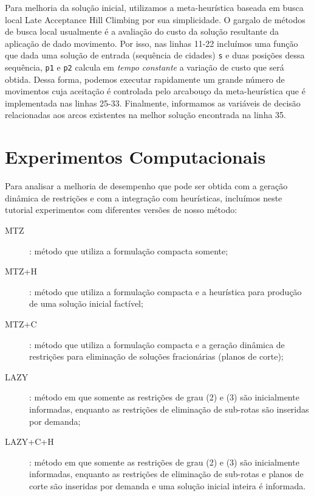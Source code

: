 \documentclass[a4paper,11pt,fleqn]{article}
\begin{document}
Para melhoria da solução inicial, utilizamos a meta-heurística baseada em busca local Late Acceptance Hill Climbing \citep{burke2017} por sua simplicidade. O gargalo de métodos de busca local usualmente é a avaliação do custo da solução resultante da aplicação de dado movimento. Por isso, nas linhas 11-22 incluímos uma função que dada uma solução de entrada (sequência de cidades) \texttt{s} e duas posições dessa sequência, \texttt{p1} e \texttt{p2} calcula em \emph{tempo constante} a variação de custo que será obtida. Dessa forma, podemos executar rapidamente um grande número de movimentos cuja aceitação é controlada pelo arcabouço da meta-heurística que é implementada nas linhas 25-33. Finalmente, informamos as variáveis de decisão relacionadas aos arcos existentes na melhor solução encontrada na linha 35.

\section{Experimentos Computacionais} \label{secExp}

Para analisar a melhoria de desempenho que pode ser obtida com a geração
dinâmica de restrições e com a integração com heurísticas, incluímos neste tutorial experimentos com diferentes versões de nosso método:

\begin{description}
	\item[\textsc{MTZ}]: método que utiliza a formulação compacta somente;
	\item[\textsc{MTZ+H}]: método que utiliza a formulação compacta e a heurística para produção de uma solução inicial factível;
	\item[\textsc{MTZ+C}]: método que utiliza a formulação compacta e a geração dinâmica de restrições para eliminação de soluções fracionárias (planos de corte);
	\item[\textsc{LAZY}]: método em que somente as restrições de grau (2) e (3) são inicialmente informadas, enquanto as restrições de eliminação de sub-rotas são inseridas por demanda;
	\item[\textsc{LAZY+C+H}]: método em que somente as restrições de grau (2) e (3) são inicialmente informadas, enquanto as restrições de eliminação de sub-rotas e planos de corte são inseridas por demanda e uma solução inicial inteira é informada.
\end{description}
\end{document}
